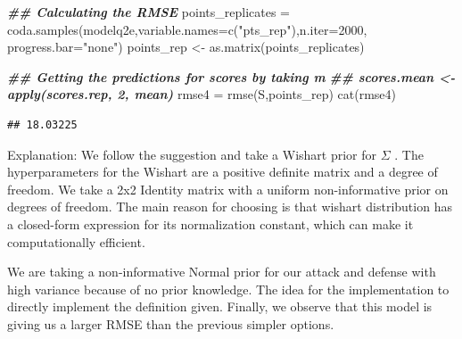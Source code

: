 \documentclass[
]{article}
\newenvironment{Shaded}{\begin{snugshade}}{\end{snugshade}}
\newcommand{\AttributeTok}[1]{\textcolor[rgb]{0.77,0.63,0.00}{#1}}
\newcommand{\DecValTok}[1]{\textcolor[rgb]{0.00,0.00,0.81}{#1}}
\newcommand{\DocumentationTok}[1]{\textcolor[rgb]{0.56,0.35,0.01}{\textbf{\textit{#1}}}}
\newcommand{\FunctionTok}[1]{\textcolor[rgb]{0.00,0.00,0.00}{#1}}
\newcommand{\NormalTok}[1]{#1}
\newcommand{\OtherTok}[1]{\textcolor[rgb]{0.56,0.35,0.01}{#1}}
\newcommand{\StringTok}[1]{\textcolor[rgb]{0.31,0.60,0.02}{#1}}
\begin{document}
\begin{Shaded}
\begin{Highlighting}[]
\DocumentationTok{\#\# Calculating the RMSE}
\NormalTok{points\_replicates }\OtherTok{=} \FunctionTok{coda.samples}\NormalTok{(modelq2e,}\AttributeTok{variable.names=}\FunctionTok{c}\NormalTok{(}\StringTok{"pts\_rep"}\NormalTok{),}\AttributeTok{n.iter=}\DecValTok{2000}\NormalTok{, }\AttributeTok{progress.bar=}\StringTok{"none"}\NormalTok{) }
\NormalTok{points\_rep }\OtherTok{\textless{}{-}} \FunctionTok{as.matrix}\NormalTok{(points\_replicates)}

\DocumentationTok{\#\# Getting the predictions for scores by taking m}
\DocumentationTok{\#\# scores.mean \textless{}{-} apply(scores.rep, 2, mean) }
\NormalTok{rmse4 }\OtherTok{=} \FunctionTok{rmse}\NormalTok{(S,points\_rep)}
\FunctionTok{cat}\NormalTok{(rmse4)}
\end{Highlighting}
\end{Shaded}

\begin{verbatim}
## 18.03225
\end{verbatim}

Explanation: We follow the suggestion and take a Wishart prior for
\(\Sigma\) . The hyperparameters for the Wishart are a positive definite
matrix and a degree of freedom. We take a 2x2 Identity matrix with a
uniform non-informative prior on degrees of freedom. The main reason for
choosing is that wishart distribution has a closed-form expression for
its normalization constant, which can make it computationally efficient.

We are taking a non-informative Normal prior for our attack and defense
with high variance because of no prior knowledge. The idea for the
implementation to directly implement the definition given. Finally, we
observe that this model is giving us a larger RMSE than the previous
simpler options.
\end{document}

